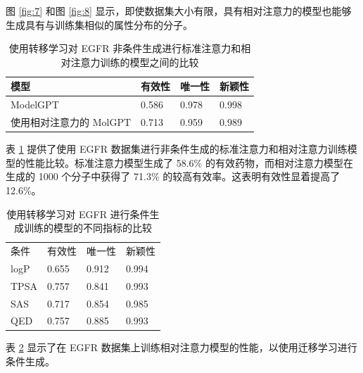 \begin{translation}
图 \ref{fig:7} 和图 \ref{fig:8} 显示，即使数据集大小有限，具有相对注意力的模型也能够生成具有与训练集相似的属性分布的分子。

\begin{table}[H]
  \centering
  \caption{使用转移学习对 EGFR 非条件生成进行标准注意力和相对注意力训练的模型之间的比较}
  \label{tab:13}
  \begin{tabular}{llll}
    \hline 模型       & 有效性   & 唯一性   & 新颖性   \\
    \hline ModelGPT & 0.586 & 0.978 & 0.998 \\
    使用相对注意力的 MolGPT & 0.713 & 0.959 & 0.989 \\
    \hline
  \end{tabular}
\end{table}

表 \ref{tab:13} 提供了使用 EGFR 数据集进行非条件生成的标准注意力和相对注意力训练模型的性能比较。标准注意力模型生成了 58.6\% 的有效药物，而相对注意力模型在生成的 1000 个分子中获得了 71.3\% 的较高有效率。这表明有效性显着提高了 12.6\%。

\begin{table}[H]
  \centering
  \caption{使用转移学习对 EGFR 进行条件生成训练的模型的不同指标的比较}
  \label{tab:14}
  \begin{tabular}{llll}
    \hline 条件 & 有效性   & 唯一性   & 新颖性   \\
    logP      & 0.655 & 0.912 & 0.994 \\
    TPSA      & 0.757 & 0.841 & 0.993 \\
    SAS       & 0.717 & 0.854 & 0.985 \\
    QED       & 0.757 & 0.885 & 0.993 \\
    \hline
  \end{tabular}
\end{table}

表 \ref{tab:14} 显示了在 EGFR 数据集上训练相对注意力模型的性能，以使用迁移学习进行条件生成。


\end{translation}
